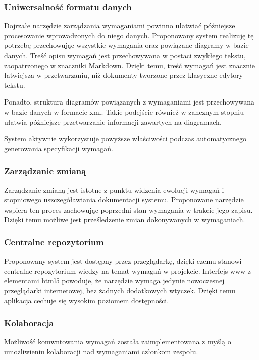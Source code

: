     \subsubsection{Uniwersalność formatu danych}
      Dojrzałe narzędzie zarządzania wymaganiami powinno ułatwiać późniejsze procesowanie wprowadzonych do niego danych. Proponowany system realizuję tę potrzebę przechowując wszystkie wymagania oraz powiązane diagramy w bazie danych. Treść opisu wymagań jest przechowywana w postaci zwykłego tekstu, zaopatrzonego w znaczniki Markdown. Dzięki temu, treść wymagań jest znacznie łatwiejsza w przetwarzaniu, niż dokumenty tworzone przez klasyczne edytory tekstu.
      
      Ponadto, struktura diagramów powiązanych z wymaganiami jest przechowywana w bazie danych w formacie xml. Takie podejście również w zancznym stopniu ułatwia późniejsze przetwarzanie informacji zawartych na diagramach. 
      
      System aktywnie wykorzystuje powyższe właściwości podczas automatycznego generowania specyfikacji wymagań.

    \subsubsection{Zarządzanie zmianą}
      Zarządzanie zmianą jest istotne z punktu widzenia ewolucji wymagań i stopniowego uszczegóławiania dokumentacji systemu. Proponowane narzędzie wspiera ten proces zachowując poprzedni stan wymagania w trakcie jego zapisu. Dzięki temu możliwe jest prześledzenie zmian dokonywanych w wymaganiach. 

    \subsubsection{Centralne repozytorium}
      Proponowany system jest dostępny przez przeglądarkę, dzięki czemu stanowi centralne repozytorium wiedzy na temat wymagań w projekcie. Interfejs www z elementami html5 powoduje, że narzędzie wymaga jedynie nowoczesnej przeglądarki internetowej, bez żadnych dodatkowych wtyczek. Dzięki temu aplikacja cechuje się wysokim poziomem dostępności.  

    \subsubsection{Kolaboracja}
      Możliwość komwntowania wymagań została zaimplementowana z myślą o umożliwieniu kolaboracji nad wymaganiami członkom zespołu.

